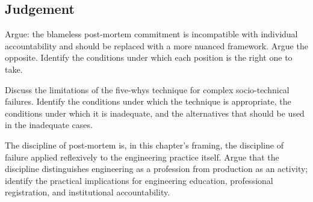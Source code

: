 \subsection*{Judgement}

\begin{exercise}
Argue: the blameless post-mortem commitment is incompatible with individual accountability and should be replaced with a more nuanced framework. Argue the opposite. Identify the conditions under which each position is the right one to take.
\end{exercise}

\begin{exercise}
Discuss the limitations of the five-whys technique for complex socio-technical failures. Identify the conditions under which the technique is appropriate, the conditions under which it is inadequate, and the alternatives that should be used in the inadequate cases.
\end{exercise}

\begin{exercise}
The discipline of post-mortem is, in this chapter's framing, the discipline of failure applied reflexively to the engineering practice itself. Argue that the discipline distinguishes engineering as a profession from production as an activity; identify the practical implications for engineering education, professional registration, and institutional accountability.
\end{exercise}
